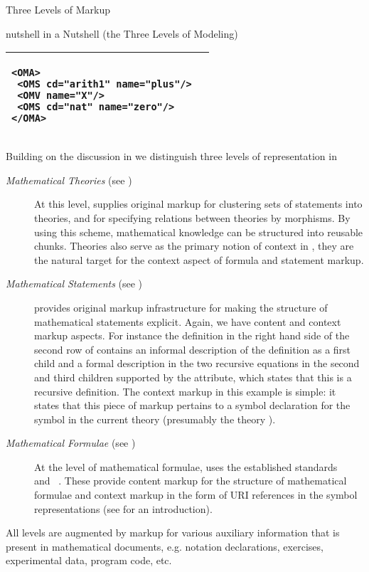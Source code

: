 \begin{omgroup}[id=omdoc-markup,short=Open Mathematical Documents]
\begin{omgroup}[id=three-level-markup]{Three Levels of Markup}
\begin{myfig}{nutshell}{{\omdoc} in a Nutshell (the Three Levels of Modeling)}
\begin{tabular}{|p{5.2cm}|p{5.4cm}|}
{\begin{minipage}[t]{5.4cm}
\begin{lstlisting}[numbers=none,frame=none]
<OMA>
 <OMS cd="arith1" name="plus"/>
 <OMV name="X"/>
 <OMS cd="nat" name="zero"/>
</OMA>
\end{lstlisting}\vspace{-3ex}\end{minipage}}\\\hline
\end{tabular}
\end{myfig}
Building on the discussion in {} we distinguish three levels of
representation in {\omdoc}
\begin{description}
\item[\emph{Mathematical Theories} (see {})] At this level,
  {\omdoc} supplies original markup for clustering sets of statements into theories, and
  for specifying relations between theories by morphisms. By using this scheme,
  mathematical knowledge can be structured into reusable chunks. Theories also serve as
  the primary notion of context in {\omdoc}, they are the natural target for the context
  aspect of formula and statement markup.
\item[\emph{Mathematical Statements} (see {})] {\omdoc} provides
  original mark\-up infrastructure for making the structure of mathematical statements
  explicit.  Again, we have content and context markup aspects. For instance the
  definition in the right hand side of the second row of {} contains an
  informal description of the definition as a first child and a formal description in the
  two recursive equations in the second and third children supported by the
  {} attribute, which states that this is a recursive
  definition. The context markup in this example is simple: it states that this piece of
  markup pertains to a symbol declaration for the symbol {} in the current
  theory (presumably the theory {}).
\item[\emph{Mathematical Formulae} (see {})] At the level of
  mathematical formulae, {\omdoc} uses the established standards
  {\openmath}~\cite{BusCapCar:2oms04} and {\cmathml}~\cite{CarIon:MathML03}.  These
  provide content markup for the structure of mathematical formulae and context markup in
  the form of URI references in the symbol representations (see {} for an
  introduction).
\end{description}
All levels are augmented by markup for various auxiliary information that is
present in mathematical documents, e.g. notation declarations, exercises,
experimental data, program code, etc.
\end{omgroup}


\end{omgroup}
